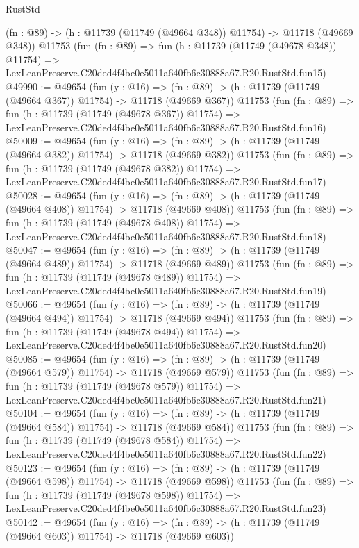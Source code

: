 \begin{lexlean}{RustStd}
\begin{coremodule}
    (fn : @89) -> (h : @11739 (@11749 (@49664 @348)) @11754) -> @11718 (@49669 @348))
    @11753
    (fun (fn : @89) =>
    fun (h : @11739 (@11749 (@49678 @348)) @11754) =>
    LexLeanPreserve.C20ded4f4be0e5011a640fb6c30888a67.R20.RustStd.fun15)
@49990 := @49654
    (fun (y : @16) =>
    (fn : @89) -> (h : @11739 (@11749 (@49664 @367)) @11754) -> @11718 (@49669 @367))
    @11753
    (fun (fn : @89) =>
    fun (h : @11739 (@11749 (@49678 @367)) @11754) =>
    LexLeanPreserve.C20ded4f4be0e5011a640fb6c30888a67.R20.RustStd.fun16)
@50009 := @49654
    (fun (y : @16) =>
    (fn : @89) -> (h : @11739 (@11749 (@49664 @382)) @11754) -> @11718 (@49669 @382))
    @11753
    (fun (fn : @89) =>
    fun (h : @11739 (@11749 (@49678 @382)) @11754) =>
    LexLeanPreserve.C20ded4f4be0e5011a640fb6c30888a67.R20.RustStd.fun17)
@50028 := @49654
    (fun (y : @16) =>
    (fn : @89) -> (h : @11739 (@11749 (@49664 @408)) @11754) -> @11718 (@49669 @408))
    @11753
    (fun (fn : @89) =>
    fun (h : @11739 (@11749 (@49678 @408)) @11754) =>
    LexLeanPreserve.C20ded4f4be0e5011a640fb6c30888a67.R20.RustStd.fun18)
@50047 := @49654
    (fun (y : @16) =>
    (fn : @89) -> (h : @11739 (@11749 (@49664 @489)) @11754) -> @11718 (@49669 @489))
    @11753
    (fun (fn : @89) =>
    fun (h : @11739 (@11749 (@49678 @489)) @11754) =>
    LexLeanPreserve.C20ded4f4be0e5011a640fb6c30888a67.R20.RustStd.fun19)
@50066 := @49654
    (fun (y : @16) =>
    (fn : @89) -> (h : @11739 (@11749 (@49664 @494)) @11754) -> @11718 (@49669 @494))
    @11753
    (fun (fn : @89) =>
    fun (h : @11739 (@11749 (@49678 @494)) @11754) =>
    LexLeanPreserve.C20ded4f4be0e5011a640fb6c30888a67.R20.RustStd.fun20)
@50085 := @49654
    (fun (y : @16) =>
    (fn : @89) -> (h : @11739 (@11749 (@49664 @579)) @11754) -> @11718 (@49669 @579))
    @11753
    (fun (fn : @89) =>
    fun (h : @11739 (@11749 (@49678 @579)) @11754) =>
    LexLeanPreserve.C20ded4f4be0e5011a640fb6c30888a67.R20.RustStd.fun21)
@50104 := @49654
    (fun (y : @16) =>
    (fn : @89) -> (h : @11739 (@11749 (@49664 @584)) @11754) -> @11718 (@49669 @584))
    @11753
    (fun (fn : @89) =>
    fun (h : @11739 (@11749 (@49678 @584)) @11754) =>
    LexLeanPreserve.C20ded4f4be0e5011a640fb6c30888a67.R20.RustStd.fun22)
@50123 := @49654
    (fun (y : @16) =>
    (fn : @89) -> (h : @11739 (@11749 (@49664 @598)) @11754) -> @11718 (@49669 @598))
    @11753
    (fun (fn : @89) =>
    fun (h : @11739 (@11749 (@49678 @598)) @11754) =>
    LexLeanPreserve.C20ded4f4be0e5011a640fb6c30888a67.R20.RustStd.fun23)
@50142 := @49654
    (fun (y : @16) =>
    (fn : @89) -> (h : @11739 (@11749 (@49664 @603)) @11754) -> @11718 (@49669 @603))

\end{coremodule}
\end{lexlean}
